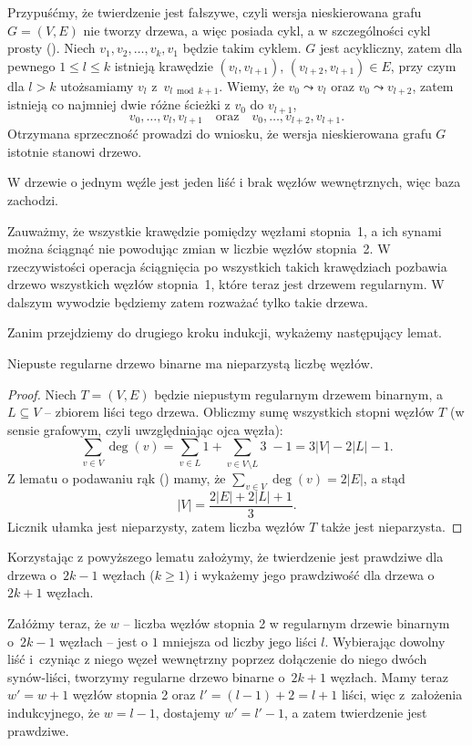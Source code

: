 \exercise{} %
Przypuśćmy, że twierdzenie jest fałszywe, czyli wersja nieskierowana grafu $G=(V,E)$ nie tworzy drzewa, a więc posiada cykl, a w szczególności cykl prosty (). Niech $v_1,v_2,\dots,v_k,v_1$ będzie takim cyklem. $G$ jest acykliczny, zatem dla pewnego $1\le l\le k$ istnieją krawędzie $(v_l,v_{l+1})$, $(v_{l+2},v_{l+1})\in E$, przy czym dla $l>k$ utożsamiamy $v_l$ z~$v_{l\bmod k+1}$. Wiemy, że $v_0\leadsto v_l$ oraz $v_0\leadsto v_{l+2}$, zatem istnieją co najmniej dwie różne ścieżki z $v_0$ do $v_{l+1}$,
\[
	v_0,\dots,v_l,v_{l+1} \quad\text{oraz}\quad v_0,\dots,v_{l+2},v_{l+1}.
\]
Otrzymana sprzeczność prowadzi do wniosku, że wersja nieskierowana grafu $G$ istotnie stanowi drzewo.

\exercise{} %
W drzewie o jednym węźle jest jeden liść i brak węzłów wewnętrznych, więc baza zachodzi.

Zauważmy, że wszystkie krawędzie pomiędzy węzłami stopnia~1, a ich synami można ściągnąć nie powodując zmian w liczbie węzłów stopnia~2. W rzeczywistości operacja ściągnięcia po wszystkich takich krawędziach pozbawia drzewo wszystkich węzłów stopnia~1, które teraz jest drzewem regularnym. W dalszym wywodzie będziemy zatem rozważać tylko takie drzewa.

Zanim przejdziemy do drugiego kroku indukcji, wykażemy następujący lemat.
\begin{lemat}
	Niepuste regularne drzewo binarne ma nieparzystą liczbę węzłów.
\end{lemat}
\begin{proof}
Niech $T=(V,E)$ będzie niepustym regularnym drzewem binarnym, a~$L\subseteq V$ -- zbiorem liści tego drzewa. Obliczmy sumę wszystkich stopni węzłów $T$ (w sensie grafowym, czyli uwzględniając ojca węzła):
\[
	\sum_{v\in V}\deg(v) = \sum_{v\in L}1+\sum_{v\in V\setminus L}\!\!\!3\;-1=3|V|-2|L|-1.
\]
Z lematu o podawaniu rąk () mamy, że $\sum_{v\in V}\deg(v) = 2|E|$, a stąd
\[
	|V| = \frac{2|E|+2|L|+1}{3}.
\]
Licznik ułamka jest nieparzysty, zatem liczba węzłów $T$ także jest nieparzysta.

\end{proof}

Korzystając z powyższego lematu założymy, że twierdzenie jest prawdziwe dla drzewa o~$2k-1$ węzłach ($k\ge1$) i wykażemy jego prawdziwość dla drzewa o $2k+1$ węzłach.

Załóżmy teraz, że $w$ -- liczba węzłów stopnia 2 w regularnym drzewie binarnym o~$2k-1$ węzłach -- jest o $1$ mniejsza od liczby jego liści $l$. Wybierając dowolny liść i~czyniąc z niego węzeł wewnętrzny poprzez dołączenie do niego dwóch synów-liści, tworzymy regularne drzewo binarne o~$2k+1$ węzłach. Mamy teraz $w'=w+1$ węzłów stopnia 2 oraz $l'=(l-1)+2=l+1$ liści, więc z~założenia indukcyjnego, że $w=l-1$, dostajemy $w'=l'-1$, a zatem twierdzenie jest prawdziwe.

